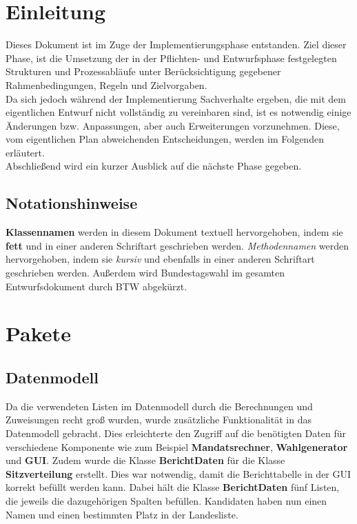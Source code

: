 \documentclass[12pt,a4paper,titlepage]{article}
\newcommand{\myma}{\fontfamily{pcr}\selectfont \textbf}
\newcommand{\mymo}{\fontfamily{pcr}\selectfont \textit}
\begin{document}
\section{Einleitung}
Dieses Dokument ist im Zuge der Implementierungsphase entstanden. Ziel dieser Phase, ist die Umsetzung der in der Pflichten- und Entwurfsphase festgelegten Strukturen und Prozessabläufe unter Berücksichtigung gegebener Rahmenbedingungen, Regeln und Zielvorgaben. \\
Da sich jedoch während der Implementierung Sachverhalte ergeben, die mit dem eigentlichen Entwurf nicht vollständig zu vereinbaren sind, ist es notwendig einige Änderungen bzw. Anpassungen, aber auch Erweiterungen vorzunehmen. Diese, vom eigentlichen Plan abweichenden Entscheidungen, werden im Folgenden erläutert. \\
Abschließend wird ein kurzer Ausblick auf die nächste Phase gegeben. \\


\subsection{Notationshinweise}
{\myma{Klassennamen}} werden in diesem Dokument textuell hervorgehoben, indem sie \textbf{fett} und in einer anderen Schriftart geschrieben werden.\newline
{\mymo{Methodennamen}} werden hervorgehoben, indem sie  \textit{kursiv} und ebenfalls in einer anderen Schriftart geschrieben werden.\newline
Außerdem wird Bundestagswahl im gesamten Entwurfsdokument durch BTW abgekürzt.
\newpage

\section{Pakete}

\subsection{Datenmodell}
Da die verwendeten Listen im Datenmodell durch die Berechnungen und Zuweisungen recht groß wurden, wurde zusätzliche Funktionalität in das Datenmodell gebracht. Dies erleichterte den Zugriff auf die benötigten Daten für verschiedene Komponente wie zum Beispiel {\myma{Mandatsrechner}}, {\myma{Wahlgenerator}} und {\myma{GUI}}.
Zudem wurde die Klasse {\myma{BerichtDaten}} für die Klasse {\myma{Sitzverteilung}} erstellt. Dies war notwendig, damit die Berichttabelle in der GUI korrekt befüllt werden kann. Dabei hält die Klasse {\myma{BerichtDaten}} fünf Listen, die jeweils die dazugehörigen Spalten befüllen. 
Kandidaten haben nun einen Namen und einen bestimmten Platz in der Landesliste.
\end{document}
